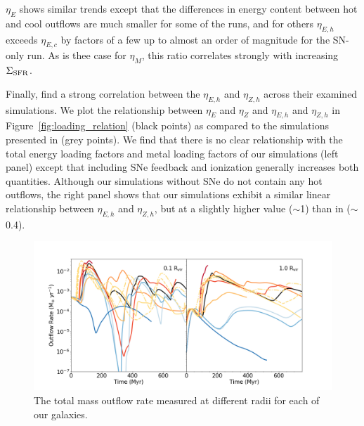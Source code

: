\documentclass[twocolumn]{aastex62}
\begin{document}
$\eta_E$ shows similar trends except that the differences in energy content between hot and cool outflows are much smaller for some of the runs, and for others $\eta_{E,h}$ exceeds $\eta_{E,c}$ by factors of a few up to almost an order of magnitude for the SN-only run. As is thee case for $\eta_M$, this ratio correlates strongly with increasing $\Sigma_{\rm SFR}$.

Finally, \citet{LiBryan2020} find a strong correlation between the $\eta_{E,h}$ and $\eta_{Z,h}$ across their examined simulations. We plot the relationship between $\eta_{E}$ and $\eta_{Z}$ and $\eta_{E,h}$ and $\eta_{Z,h}$ in Figure~\ref{fig:loading_relation} (black points) as compared to the simulations presented in \citet{LiBryan2020} (grey points). We find that there is no clear relationship with the total energy loading factors and metal loading factors of our simulations (left panel) except that including SNe feedback and ionization generally increases both quantities. Although our simulations without SNe do not contain any hot outflows, the right panel shows that our simulations exhibit a similar linear relationship between $\eta_{E,h}$ and $\eta_{Z,h}$, but at a slightly higher value ($\sim$1) than in \citet{LiByran2020} ($\sim$0.4).


\begin{figure}
  \centering
  \includegraphics[width=0.95\linewidth]{figures/physics_comparison_outflow}
  \caption{The total mass outflow rate measured at different radii for each of our galaxies.}
  \label{fig:outflow_evolution}
\end{figure}



\end{document}
